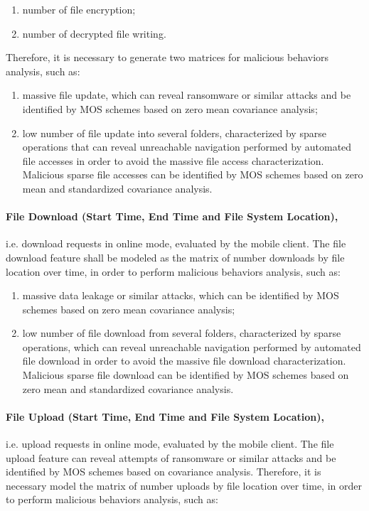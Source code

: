 \begin{enumerate}
	\item number of file encryption;
	\item number of decrypted file writing.
\end{enumerate}

Therefore, it is necessary to generate two matrices for malicious behaviors analysis, such as: 

\begin{enumerate}[label=(\alph*)]
	\item massive file update, which can reveal ransomware or similar attacks and be identified by MOS schemes based on zero mean covariance analysis; 
	\item low number of file update into several folders, characterized by sparse operations that can reveal unreachable navigation performed by automated file accesses in order to avoid the massive file access characterization. Malicious sparse file accesses can be identified by MOS schemes based on zero mean and standardized covariance analysis.
\end{enumerate}

\paragraph{\textbf{File Download (Start Time, End Time and File System Location)},}i.e. download requests in online mode, evaluated by the mobile client. The file download feature shall be modeled as the matrix of number downloads by file location over time, in order to perform malicious behaviors analysis, such as:

\begin{enumerate}
	\item massive data leakage or similar attacks, which can be identified by MOS schemes based on zero mean covariance analysis;
	\item low number of file download from several folders, characterized by sparse operations, which can reveal unreachable navigation performed by automated file download in order to avoid the massive file download characterization. Malicious sparse file download can be identified by MOS schemes based on zero mean and standardized covariance analysis.
\end{enumerate}

\paragraph{\textbf{File Upload (Start Time, End Time and File System Location)},}i.e. upload requests in online mode, evaluated by the mobile client. The file upload feature can reveal attempts of ransomware or similar attacks and be identified by MOS schemes based on covariance analysis. Therefore, it is necessary model the matrix of number uploads by file location over time, in order to perform malicious behaviors analysis, such as:

